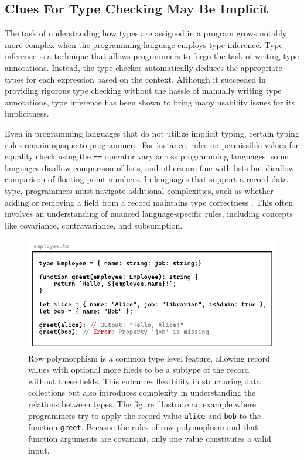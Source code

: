 \subsection{Clues For Type Checking May Be Implicit}

The task of understanding how types are assigned in a program grows notably more complex when the programming language employs type inference. Type inference \cite{Damas1982-sc} is a technique that allows programmers to forgo the task of writing type annotations. Instead, the type checker automatically deduces the appropriate types for each expression based on the context. Although it succeeded in providing rigorous type checking without the hassle of manually writing type annotations, type inference has been shown to bring many usability issues \cite{Jun2002-xp, Wand1986-lu} for its implicitness.  

Even in programming languages that do not utilize implicit typing, certain typing rules remain opaque to programmers. For instance, rules on permissible values for equality check using the \texttt{==} operator vary across programming languages; some languages disallow comparison of lists, and others are fine with lists but disallow comparison of floating-point numbers. In languages that support a record data type, programmers must navigate additional complexities, such as whether adding or removing a field from a record maintains type correctness \cite{fig:row-polymophism}. This often involves an understanding of nuanced language-specific rules, including concepts like covariance, contravariance, and subsumption.


\begin{figure}[hbt]
  \includegraphics[width=\linewidth]{RowPolymorphism.pdf}
  \caption{
    \label{fig:row-polymophism}
Row polymorphism is a common type level feature, allowing record values with optional more fileds to be a subtype of the record without these fields. This enhances flexibility in structuring data collections but also introduces complexity in understanding the relations between types. The figure illustrate an example where programmers try to apply the record value \texttt{alice} and \texttt{bob} to the function \texttt{greet}. Becasue the rules of row polymophism and that function arguments are covariant, only one value constitutes a valid input. 
    }
\end{figure}

